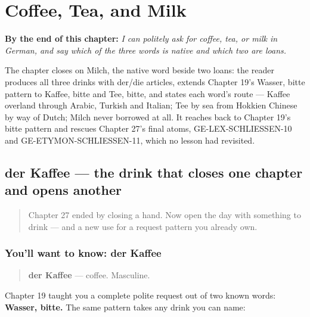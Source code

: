 
\chapter{Coffee, Tea, and Milk}
\label{ch:ge-coffee-tea-milk}

\begin{chapteropening}
\textbf{By the end of this chapter:} \emph{I can politely ask for coffee, tea, or milk in German, and say which of the three words is native and which two are loans.}

The chapter closes on Milch, the native word beside two loans: the reader produces all three drinks with der/die articles, extends Chapter 19's Wasser, bitte pattern to Kaffee, bitte and Tee, bitte, and states each word's route — Kaffee overland through Arabic, Turkish and Italian; Tee by sea from Hokkien Chinese by way of Dutch; Milch never borrowed at all. It reaches back to Chapter 19's bitte pattern and rescues Chapter 27's final atoms, GE-LEX-SCHLIESSEN-10 and GE-ETYMON-SCHLIESSEN-11, which no lesson had revisited.
\end{chapteropening}

\section[der Kaffee]{der Kaffee — the drink that closes one chapter and opens another}

\label{lesson:GE-C28-kaffee}



\begin{quote}
Chapter 27 ended by closing a hand. Now open the day with something to drink — and a new use for a request pattern you already own.
\end{quote}

\subsection*{You'll want to know: der Kaffee}
\begin{quote}
\textbf{der Kaffee} — coffee. Masculine.
\end{quote}

Chapter 19 taught you a complete polite request out of two known words: \textbf{Wasser, bitte.} The same pattern takes any drink you can name:


